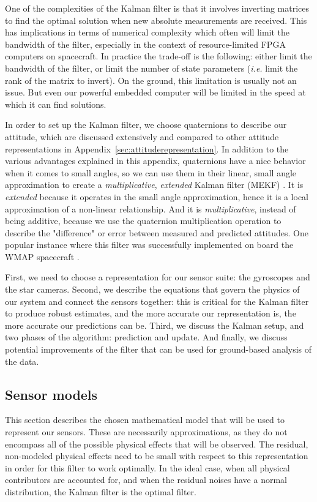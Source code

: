 One of the complexities of the Kalman filter is that it involves inverting matrices to find the optimal solution when new absolute measurements are received. This has implications in terms of numerical complexity which often will limit the bandwidth of the filter, especially in the context of resource-limited FPGA computers on spacecraft. In practice the trade-off is the following: either limit the bandwidth of the filter, or limit the number of state parameters (\textit{i.e.} limit the rank of the matrix to invert). On the ground, this limitation is usually not an issue. But even our powerful embedded computer will be limited in the speed at which it can find solutions.

In order to set up the Kalman filter, we choose quaternions to describe our attitude, which are discussed extensively and compared to other attitude representations in Appendix~\ref{sec:attituderepresentation}. In addition to the various advantages explained in this appendix, quaternions have a nice behavior when it comes to small angles, so we can use them in their linear, small angle approximation to create a \textit{multiplicative}, \textit{extended} Kalman filter (MEKF) \citep{Lefferts:1982dx}. It is \textit{extended} because it operates in the small angle approximation, hence it is a local approximation of a non-linear relationship. And it is \textit{multiplicative}, instead of being additive, because we use the quaternion multiplication operation to describe the "difference" or error between measured and predicted attitudes. One popular instance where this filter was successfully implemented on board the WMAP spacecraft \citep{Harman:2005ux}.

First, we need to choose a representation for our sensor suite: the gyroscopes and the star cameras. Second, we describe the equations that govern the physics of our system and connect the sensors together: this is critical for the Kalman filter to produce robust estimates, and the more accurate our representation is, the more accurate our predictions can be. Third, we discuss the Kalman setup, and two phases of the algorithm: prediction and update. And finally, we discuss potential improvements of the filter that can be used for ground-based analysis of the data.

\subsection{Sensor models}
\label{sec:SensorModels}

This section describes the chosen mathematical model that will be used to represent our sensors. These are necessarily approximations, as they do not encompass all of the possible physical effects that will be observed. The residual, non-modeled physical effects need to be small with respect to this representation in order for this filter to work optimally. In the ideal case, when all physical contributors are accounted for, and when the residual noises have a normal distribution, the Kalman filter is the optimal filter. 

